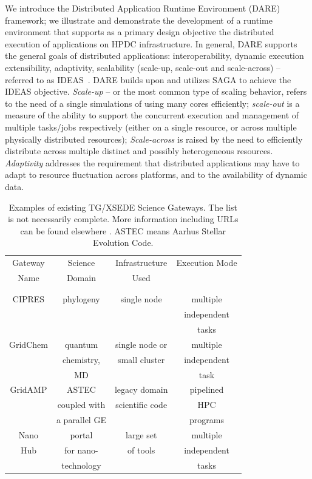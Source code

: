 \documentclass[]{svjour3}
\begin{document}
We introduce the Distributed Application Runtime Environment (DARE)
framework; we illustrate and demonstrate the development of a runtime
environment that supports as a primary design objective the
distributed execution of applications on HPDC infrastructure.  In
general, DARE supports the general goals of distributed applications:
interoperability, dynamic execution %
extensibility, adaptivity, scalability (scale-up, scale-out and
scale-across) -- referred to as IDEAS~\cite{ideas}.  DARE builds upon
and utilizes SAGA to achieve the IDEAS objective.  {\it Scale-up} --
or the most common type of scaling behavior, refers to the need of a
single simulations of using many cores efficiently; {\it scale-out} is
a measure of the ability to support the concurrent execution and
management of multiple tasks/jobs respectively (either on a single
resource, or across multiple physically distributed resources); {\it
  Scale-across} is raised by the need to efficiently distribute across
multiple distinct and possibly heterogeneous resources. {\it
  Adaptivity} addresses the requirement that distributed applications
may have to adapt to resource fluctuation across platforms, and to the
availability of dynamic data.

\begin{table}
\centering
 \small
\begin{tabular}{|c|c|c|c|} 
  \hline Gateway  & Science & Infrastructure & Execution Mode 
  \\
  Name & Domain & Used & \\ 
  &  &  & \\
  & & & \\  \hline \hline 
  
  CIPRES   & phylogeny  &  single node  & multiple  \\
   &  &   & independent   \\ 
  &  &  &  tasks \\  \hline
  GridChem   & quantum & single node or     & multiple  \\
     & chemistry, & small cluster & independent   \\
  & MD &  & task  \\ \hline
   GridAMP     & ASTEC  & legacy domain  & pipelined \\ 
  & coupled with  &  scientific code   & HPC  \\
  & a parallel GE &   &  programs \\ \hline
  Nano  & portal  & large set   & multiple \\
  Hub  & for nano- & of tools  & independent \\
   & technology &  & tasks \\ \hline
  \hline
\end{tabular} \caption{Examples of existing TG/XSEDE Science Gateways. The list is not necessarily complete. More information including URLs can be found elsewhere \cite{tg-sg-list-url}. ASTEC means Aarhus Stellar Evolution Code.}
 \label{table:TG-sg} 
\end{table}
\end{document}
